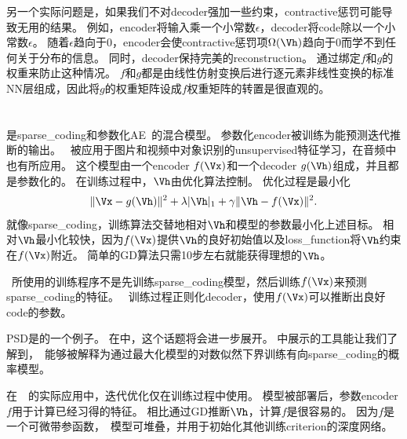 另一个实际问题是，如果我们不对\gls{decoder}强加一些约束，\gls{contractive}惩罚可能导致无用的结果。
例如，\gls{encoder}将输入乘一个小常数$\epsilon$，\gls{decoder}将\gls{code}除以一个小常数$\epsilon$。
随着$\epsilon$趋向于0，\gls{encoder}会使\gls{contractive}惩罚项$\Omega(\Vh)$趋向于0而学不到任何关于分布的信息。
同时，\gls{decoder}保持完美的\gls{reconstruction}。
\citet{Rifai+al-2011-small}通过绑定$f$和$g$的权重来防止这种情况。
$f$和$g$都是由线性仿射变换后进行逐元素非线性变换的标准\gls{NN}层组成，因此将$g$的权重矩阵设成$f$权重矩阵的转置是很直观的。


\section{}
\label{sec:predictive_sparse_decomposition}

是\gls{sparse_coding}和参数化\gls{AE}~\citep{koray-psd-08}的混合模型。
参数化\gls{encoder}被训练为能预测迭代推断的输出。
~被应用于图片和视频中对象识别的\gls{unsupervised}特征学习\citep{Koray-08-small,koray-nips-10-small,Jarrett-ICCV2009-small,farabet-suml-11}，在音频中也有所应用\citep{henaff-ismir-11-small}。
这个模型由一个\gls{encoder} $f(\Vx)$和一个\gls{decoder} $g(\Vh)$组成，并且都是参数化的。
在训练过程中，$\Vh$由优化算法控制。
优化过程是最小化
\begin{align}
 \| \Vx - g(\Vh) \| ^2 + \lambda | \Vh |_1 + \gamma \| \Vh - f(\Vx) \|^2.
\end{align}
就像\gls{sparse_coding}，训练算法交替地相对$\Vh$和模型的参数最小化上述目标。
相对$\Vh$最小化较快，因为$f(\Vx)$提供$\Vh$的良好初始值以及\gls{loss_function}将$\Vh$约束在$f(\Vx)$附近。
简单的\gls{GD}算法只需10步左右就能获得理想的$\Vh$。


~所使用的训练程序不是先训练\gls{sparse_coding}模型，然后训练$f(\Vx)$来预测\gls{sparse_coding}的特征。
~训练过程正则化\gls{decoder}，使用$f(\Vx)$可以推断出良好\gls{code}的参数。


\gls{PSD}是的一个例子。
在中，这个话题将会进一步展开。
中展示的工具能让我们了解到，~能够被解释为通过最大化模型的对数似然下界训练有向\gls{sparse_coding}的概率模型。


在~~的实际应用中，迭代优化仅在训练过程中使用。
模型被部署后，参数\gls{encoder} $f$用于计算已经习得的特征。
相比通过\gls{GD}推断$\Vh$，计算$f$是很容易的。
因为$f$是一个可微带参函数，~模型可堆叠，并用于初始化其他训练\gls{criterion}的深度网络。

